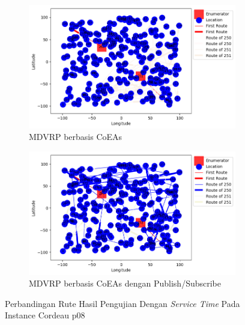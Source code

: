 \begin{figure}[H]
	\centering
	\begin{subfigure}[t]{\textwidth}
		\centering
		\includegraphics[width=\textwidth]{Resources/Images/cordeau_p08_tw/cordeau_p08_tw_coes}
		\caption{MDVRP berbasis CoEAs}
		\label{fig:cordeau_p08_tw_coes}
	\end{subfigure}
	\begin{subfigure}[t]{\textwidth}
		\centering
		\includegraphics[width=\textwidth]{Resources/Images/cordeau_p08_tw/cordeau_p08_tw_pubsub_coes}
		\caption{MDVRP berbasis CoEAs dengan Publish/Subscribe}
		\label{fig:cordeau_p08_tw_pubsub_coes}
	\end{subfigure}
	\caption{Perbandingan Rute Hasil Pengujian Dengan \textit{Service Time} Pada Instance Cordeau p08}
	\label{fig:cordeau_p08_tw}
\end{figure}


